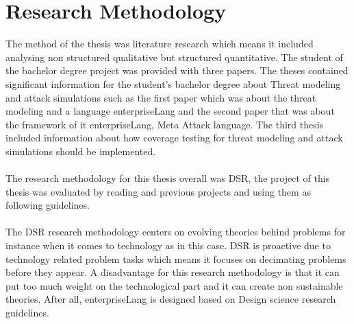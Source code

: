 \documentclass[english]{kththesis}
\begin{document}
\section{Research Methodology}

The method of the thesis was literature research which means it included analysing non structured qualitative but structured quantitative. The student of the bachelor degree project was provided with three papers\cite{xiong2021cyber,johnson2018mal,hersen2021towards}. The theses contained significant information for the student’s bachelor degree about Threat modeling and attack simulations such as the first paper which was about the threat modeling and a language enterpriseLang and the  second paper that was about the framework of it enterpriseLang, Meta Attack language. The third thesis included information about how coverage testing for threat modeling and attack simulations should be implemented.
\\\\
The research methodology for this thesis overall was \gls{DSR}, the project of this thesis was evaluated by reading and previous projects and using them as following guidelines. 
\\\\
The \gls{DSR} research methodology centers on evolving theories behind problems for instance when it comes to technology as in this case. \gls{DSR} is proactive due to technology related problem tasks which means it focuses on decimating problems before they appear.  A disadvantage for this research methodology is that it can put too much weight on the technological part and it can create non sustainable theories\cite{hevner2004design}. After all, enterpriseLang is designed based on Design science research guidelines\cite{peffers2007design}.
\end{document}
